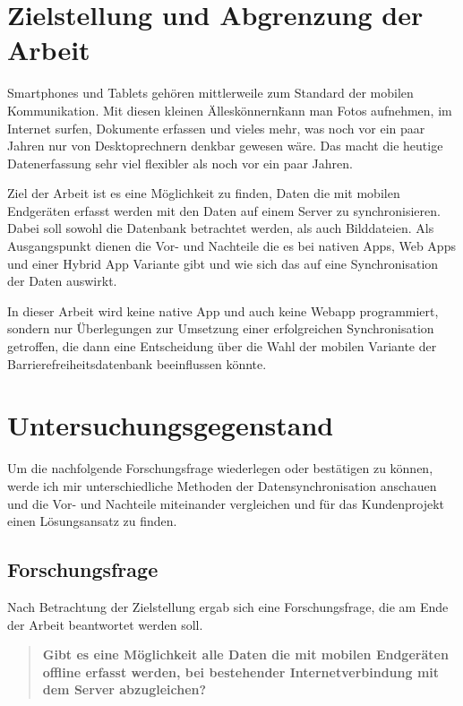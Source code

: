 \section{Zielstellung und Abgrenzung der Arbeit}
\label{sec:goal:goal}

Smartphones und Tablets gehören mittlerweile zum Standard der mobilen Kommunikation. Mit diesen kleinen \"Alleskönnern\" kann man Fotos aufnehmen, im Internet surfen, Dokumente erfassen und vieles mehr, was noch vor ein paar Jahren nur von Desktoprechnern denkbar gewesen wäre. Das macht die heutige Datenerfassung sehr viel flexibler als noch vor ein paar Jahren.

Ziel der Arbeit ist es eine Möglichkeit zu finden, Daten die mit mobilen Endgeräten erfasst werden mit den Daten auf einem Server zu synchronisieren.  Dabei soll sowohl die Datenbank betrachtet werden, als auch Bilddateien. Als Ausgangspunkt dienen die Vor- und Nachteile die es bei nativen Apps, Web Apps und einer Hybrid App Variante gibt und wie sich das auf eine Synchronisation der Daten auswirkt.

In dieser Arbeit wird keine native App und auch keine Webapp programmiert, sondern nur Überlegungen zur Umsetzung einer erfolgreichen Synchronisation getroffen, die dann eine Entscheidung über die Wahl der mobilen Variante der Barrierefreiheitsdatenbank beeinflussen könnte.

\section{Untersuchungsgegenstand}
\label{sec:investigation:inv}

Um die nachfolgende Forschungsfrage wiederlegen oder bestätigen zu können, werde ich mir unterschiedliche Methoden der Datensynchronisation anschauen und die Vor- und Nachteile miteinander vergleichen und für das Kundenprojekt einen Lösungsansatz zu finden.

\subsection{Forschungsfrage}
\label{subsec:problem:prob}

Nach Betrachtung der Zielstellung ergab sich eine Forschungsfrage, die am Ende der Arbeit beantwortet werden soll.

\begin{quote}
	\textbf {Gibt es eine Möglichkeit alle Daten die mit mobilen Endgeräten offline erfasst werden, bei bestehender Internetverbindung mit dem Server abzugleichen?}
\end{quote}

